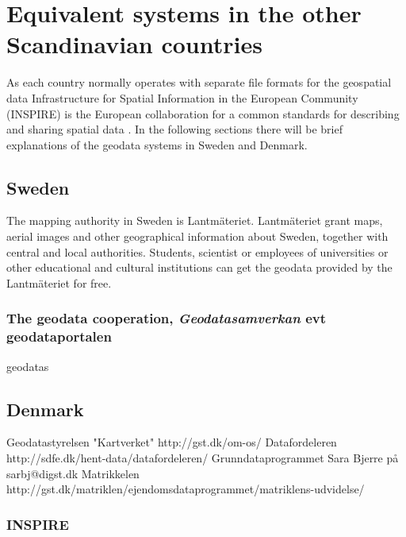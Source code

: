 \chapter{Equivalent systems in the other Scandinavian countries}
 As each country normally operates with separate file formats for the geospatial data \cite{Frenvik2017}
 Infrastructure for Spatial Information in the European Community (INSPIRE) is the European collaboration for a common standards for describing and sharing spatial data \cite{INSPIRE}. In the following sections there will be brief explanations of the geodata systems in Sweden and Denmark.


\section{Sweden}
The mapping authority in Sweden is Lantm\"{a}teriet. Lantm\"{a}teriet grant maps, aerial images and other geographical information about Sweden, together with central and local authorities. Students, scientist or employees of universities or other educational and cultural institutions can get the geodata provided by the Lantm\"{a}teriet for free.  

\subsection{The geodata cooperation, \textit{Geodatasamverkan}  evt geodataportalen} 

 
geodatas

\section{Denmark}
Geodatastyrelsen "Kartverket" http://gst.dk/om-os/
Datafordeleren http://sdfe.dk/hent-data/datafordeleren/
Grunndataprogrammet Sara Bjerre på sarbj@digst.dk
Matrikkelen http://gst.dk/matriklen/ejendomsdataprogrammet/matriklens-udvidelse/



\subsection{INSPIRE}
